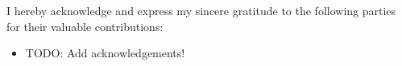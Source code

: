 \begin{acknowledgements}
    I hereby acknowledge and express my sincere gratitude to the following parties for their valuable contributions:
    \begin{itemize}
        \item TODO: Add acknowledgements!
    \end{itemize}
\end{acknowledgements}